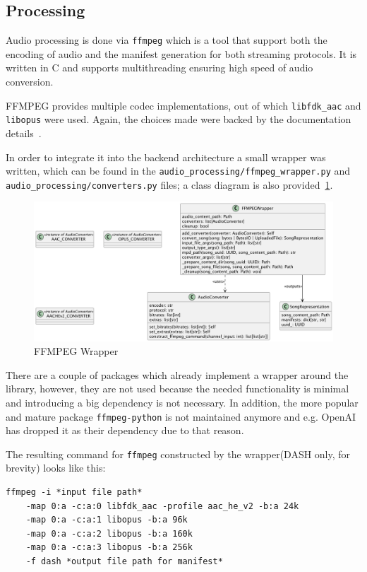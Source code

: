 \subsection{Processing}
Audio processing is done via \texttt{ffmpeg}\cite{ffmpeg} which is a tool that support both the encoding of audio and the
manifest generation for both streaming protocols. It is written in C and supports multithreading ensuring high speed of
audio conversion.

FFMPEG provides multiple codec implementations, out of which \texttt{libfdk\_aac} and \texttt{libopus} were used.
Again, the choices made were backed by the documentation details~\cite{libfdkaac,libopus}.

In order to integrate it into the backend architecture a small wrapper was written, which can be found in the
\texttt{audio\_processing/ffmpeg\_wrapper.py} and \texttt{audio\_processing/converters.py} files; a class diagram is also
provided~\ref{fig:ffmpeg}.

\begin{figure}[htbp]
    \centering
    \includegraphics[width=1\textwidth, keepaspectratio]{diagrams/ffmpeg.png}
    \caption{FFMPEG Wrapper}
    \label{fig:ffmpeg}
\end{figure}

There are a couple of packages which already implement a wrapper around the library, however,
they are not used because the needed functionality is minimal and introducing a big
dependency is not necessary. In addition, the more popular and mature package \texttt{ffmpeg-python}\cite{ffmpegpython}
is not maintained anymore and e.g. OpenAI has dropped it as their dependency due to that reason\cite{ffmpegopenai}.

The resulting command for \texttt{ffmpeg} constructed by the wrapper(DASH only, for brevity) looks like this:

\begin{verbatim}
ffmpeg -i *input file path*
    -map 0:a -c:a:0 libfdk_aac -profile aac_he_v2 -b:a 24k
    -map 0:a -c:a:1 libopus -b:a 96k
    -map 0:a -c:a:2 libopus -b:a 160k
    -map 0:a -c:a:3 libopus -b:a 256k
    -f dash *output file path for manifest*
\end{verbatim}

